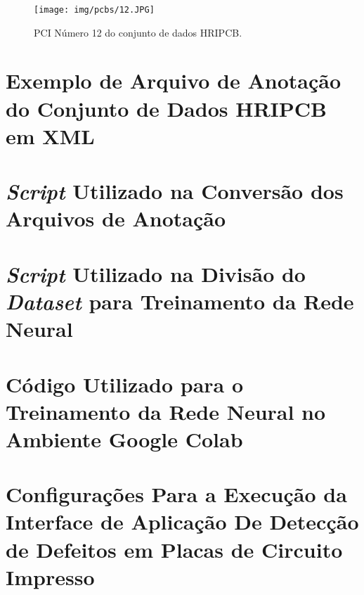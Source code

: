 \begin{figure}[!h] %
  \centering
  \caption{PCI Número 12 do conjunto de dados HRIPCB.}
  \texttt{[image: img/pcbs/12.JPG]}
  \label{fig:ap-pcbs-12}
\end{figure}


\chapter{Exemplo de Arquivo de Anotação do Conjunto de Dados HRIPCB em XML} \label{apendice:hripcb-xml}


\chapter{\textit{Script} Utilizado na Conversão dos Arquivos de Anotação} \label{apendice:conversao}


\chapter{\textit{Script} Utilizado na Divisão do \textit{Dataset} para Treinamento da Rede Neural} \label{apendice:divisao}


\chapter{Código Utilizado para o Treinamento da Rede Neural no Ambiente Google Colab} \label{apendice:treinamento}


\chapter{Configurações Para a Execução da Interface de Aplicação De Detecção de Defeitos em Placas de Circuito Impresso} \label{apendice:conf-api}







%
